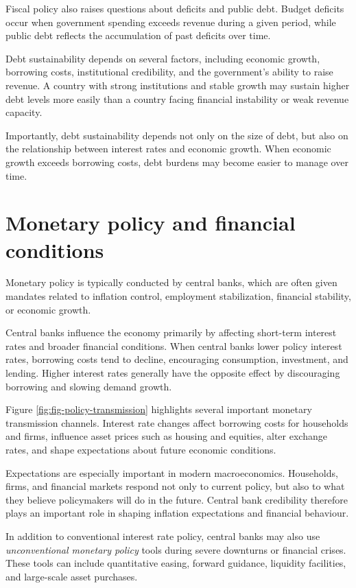 \documentclass[
  11pt,
  oneside]{book}
\begin{document}
Fiscal policy also raises questions about deficits and public debt. Budget deficits occur when government spending exceeds revenue during a given period, while public debt reflects the accumulation of past deficits over time.

Debt sustainability depends on several factors, including economic growth, borrowing costs, institutional credibility, and the government's ability to raise revenue. A country with strong institutions and stable growth may sustain higher debt levels more easily than a country facing financial instability or weak revenue capacity.

Importantly, debt sustainability depends not only on the size of debt, but also on the relationship between interest rates and economic growth. When economic growth exceeds borrowing costs, debt burdens may become easier to manage over time.

\section{Monetary policy and financial conditions}\label{monetary-policy-and-financial-conditions}

Monetary policy is typically conducted by central banks, which are often given mandates related to inflation control, employment stabilization, financial stability, or economic growth.

Central banks influence the economy primarily by affecting short-term interest rates and broader financial conditions. When central banks lower policy interest rates, borrowing costs tend to decline, encouraging consumption, investment, and lending. Higher interest rates generally have the opposite effect by discouraging borrowing and slowing demand growth.

Figure \ref{fig:fig-policy-transmission} highlights several important monetary transmission channels. Interest rate changes affect borrowing costs for households and firms, influence asset prices such as housing and equities, alter exchange rates, and shape expectations about future economic conditions.

Expectations are especially important in modern macroeconomics. Households, firms, and financial markets respond not only to current policy, but also to what they believe policymakers will do in the future. Central bank credibility therefore plays an important role in shaping inflation expectations and financial behaviour.

In addition to conventional interest rate policy, central banks may also use \emph{unconventional monetary policy} tools during severe downturns or financial crises. These tools can include quantitative easing, forward guidance, liquidity facilities, and large-scale asset purchases.
\end{document}
